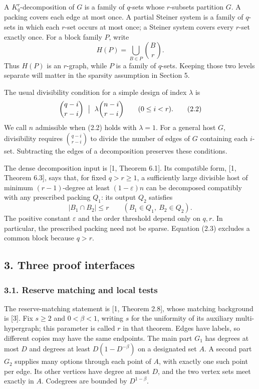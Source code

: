 \documentclass[english,11pt,a4paper]{article}
\begin{document}
A \(K_q^r\)-decomposition of \(G\) is a family of \(q\)-sets whose \(r\)-subsets partition \(G\). A packing covers each edge at most once. A partial Steiner system is a family of \(q\)-sets in which each \(r\)-set occurs at most once; a Steiner system covers every \(r\)-set exactly once. For a block family \(P\), write \[H(P)=\bigcup_{B\in P}\binom Br.
\tag{2.1}\] Thus \(H(P)\) is an \(r\)-graph, while \(P\) is a family of \(q\)-sets. Keeping those two levels separate will matter in the sparsity assumption in Section 5.

The usual divisibility condition for a simple design of index \(\lambda\) is \[\binom{q-i}{r-i}\ \bigm|\ \lambda\binom{n-i}{r-i}
\qquad(0\le i<r).
\tag{2.2}\] We call \(n\) admissible when (2.2) holds with \(\lambda=1\). For a general host \(G\), divisibility requires \(\binom{q-i}{r-i}\) to divide the number of edges of \(G\) containing each \(i\)-set. Subtracting the edges of a decomposition preserves these conditions.

The dense decomposition input is {[}1, Theorem 6.1{]}. Its compatible form, {[}1, Theorem 6.3{]}, says that, for fixed \(q>r\ge1\), a sufficiently large divisible host of minimum \((r-1)\)-degree at least \((1-\varepsilon)n\) can be decomposed compatibly with any prescribed packing \(Q_1\): its output \(Q_2\) satisfies \[|B_1\cap B_2|\le r
\qquad(B_1\in Q_1,\ B_2\in Q_2).
\tag{2.3}\] The positive constant \(\varepsilon\) and the order threshold depend only on \(q,r\). In particular, the prescribed packing need not be sparse. Equation (2.3) excludes a common block because \(q>r\).

\subsection{3. Three proof interfaces}\label{three-proof-interfaces}


\subsubsection{3.1. Reserve matching and local tests}\label{reserve-matching-and-local-tests}

The reserve-matching statement is {[}1, Theorem 2.8{]}, whose matching background is {[}3{]}. Fix \(s\ge2\) and \(0<\beta<1\), writing \(s\) for the uniformity of its auxiliary multi-hypergraph; this parameter is called \(r\) in that theorem. Edges have labels, so different copies may have the same endpoints. The main part \(G_1\) has degrees at most \(D\) and degrees at least \(D(1-D^{-\beta})\) on a designated set \(A\). A second part \(G_2\) supplies many options through each point of \(A\), with exactly one such point per edge. Its other vertices have degree at most \(D\), and the two vertex sets meet exactly in \(A\). Codegrees are bounded by \(D^{1-\beta}\).
\end{document}
